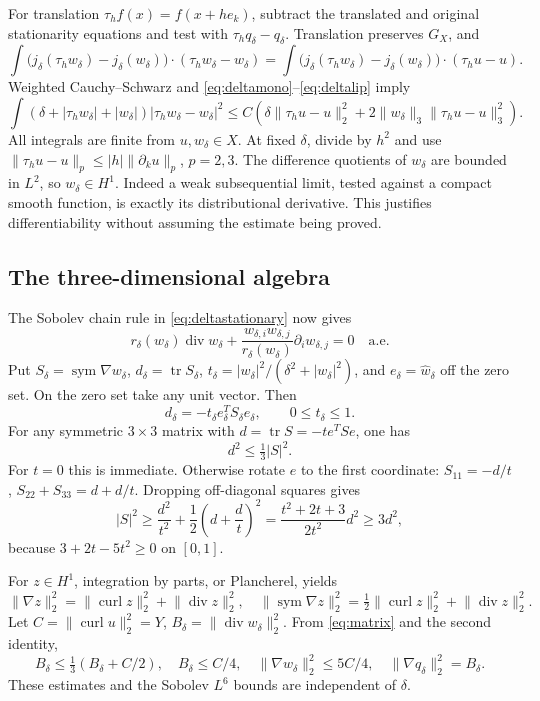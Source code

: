 \documentclass[11pt,a4paper]{article}
\theoremstyle{definition}
\theoremstyle{remark}
\newcommand{\norm}[1]{\lVert #1\rVert}
\newcommand{\diver}{\operatorname{div}}
\newcommand{\curl}{\operatorname{curl}}
\newcommand{\sym}{\operatorname{sym}}
\newcommand{\tr}{\operatorname{tr}}
\numberwithin{equation}{section}
\begin{document}
For translation \(\tau_hf(x)=f(x+he_k)\), subtract the translated and original stationarity equations and test with \(\tau_hq_\delta-q_\delta\). Translation preserves \(G_X\), and
\[
\int\big(j_\delta(\tau_hw_\delta)-j_\delta(w_\delta)\big)\cdot(\tau_hw_\delta-w_\delta)
=\int\big(j_\delta(\tau_hw_\delta)-j_\delta(w_\delta)\big)\cdot(\tau_hu-u).
\]
Weighted Cauchy--Schwarz and \eqref{eq:deltamono}--\eqref{eq:deltalip} imply
\begin{equation}\label{eq:deltadq}
\int(\delta+|\tau_hw_\delta|+|w_\delta|)|\tau_hw_\delta-w_\delta|^2
\le C\left(\delta\norm{\tau_hu-u}_2^2+
2\norm{w_\delta}_3\norm{\tau_hu-u}_3^2\right).
\end{equation}
All integrals are finite from \(u,w_\delta\in X\). At fixed \(\delta\), divide by \(h^2\) and use \(\norm{\tau_hu-u}_p\le|h|\norm{\partial_ku}_p\), \(p=2,3\). The difference quotients of \(w_\delta\) are bounded in \(L^2\), so \(w_\delta\in H^1\). Indeed a weak subsequential limit, tested against a compact smooth function, is exactly its distributional derivative. This justifies differentiability without assuming the estimate being proved.

\subsection{The three-dimensional algebra}
The Sobolev chain rule in \eqref{eq:deltastationary} now gives
\[
r_\delta(w_\delta)\diver w_\delta+
\frac{w_{\delta,i}w_{\delta,j}}{r_\delta(w_\delta)}\partial_iw_{\delta,j}=0
\quad\text{a.e.}
\]
Put \(S_\delta=\sym\nabla w_\delta\), \(d_\delta=\tr S_\delta\),
\(t_\delta=|w_\delta|^2/(\delta^2+|w_\delta|^2)\), and \(e_\delta=\widehat w_\delta\) off the zero set. On the zero set take any unit vector. Then
\[
d_\delta=-t_\delta e_\delta^TS_\delta e_\delta,
\qquad 0\le t_\delta\le1.
\]
For any symmetric \(3\times3\) matrix with \(d=\tr S=-te^TSe\), one has
\begin{equation}\label{eq:matrix}
d^2\le\tfrac13|S|^2.
\end{equation}
For \(t=0\) this is immediate. Otherwise rotate \(e\) to the first coordinate: \(S_{11}=-d/t\), \(S_{22}+S_{33}=d+d/t\). Dropping off-diagonal squares gives
\[
|S|^2\ge\frac{d^2}{t^2}+\frac12\left(d+\frac dt\right)^2
=\frac{t^2+2t+3}{2t^2}d^2\ge3d^2,
\]
because \(3+2t-5t^2\ge0\) on \([0,1]\).

For \(z\in H^1\), integration by parts, or Plancherel, yields
\begin{equation}\label{eq:globaldivcurl}
\norm{\nabla z}_2^2=\norm{\curl z}_2^2+\norm{\diver z}_2^2,
\quad
\norm{\sym\nabla z}_2^2=\tfrac12\norm{\curl z}_2^2+\norm{\diver z}_2^2.
\end{equation}
Let \(C=\norm{\curl u}_2^2=Y\), \(B_\delta=\norm{\diver w_\delta}_2^2\). From \eqref{eq:matrix} and the second identity,
\[
B_\delta\le\tfrac13(B_\delta+C/2),
\quad B_\delta\le C/4,
\quad\norm{\nabla w_\delta}_2^2\le5C/4,
\quad\norm{\nabla q_\delta}_2^2=B_\delta.
\]
These estimates and the Sobolev \(L^6\) bounds are independent of \(\delta\).
\end{document}

